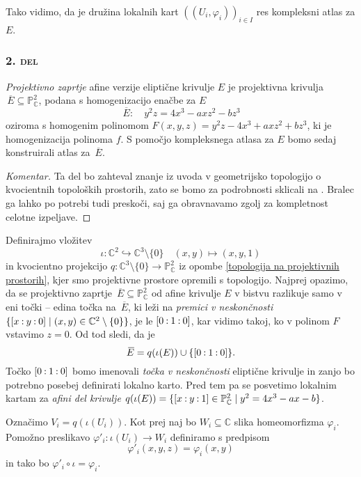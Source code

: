 \documentclass[mat1]{fmfdelo}
\numberwithin{equation}{section}
\newcommand{\C}{\mathbb C}
\newcommand{\PC}{\mathbb{P}^2_\C}
\newcommand{\oio}{\pcoor{0: 1 : 0}}
\newcommand{\pcoor}[1]{%
\begingroup\lccode`~=`: \lowercase{\endgroup
\edef~}{\mathbin{\mathchar\the\mathcode`:}\nobreak}%
\left[%
\begingroup
\mathcode`:=\string"8000
#1%
\endgroup
\right]%
}
\newcommand{\olsi}[1]{\,\overline{\!{#1}}} %
\theoremstyle{definition}
\newenvironment{komentar}[1][Komentar]{\begin{proof}[#1]\let\qed\relax}{\end{proof}}
\begin{document}
Tako vidimo, da je družina lokalnih kart $((U_i, \varphi_i))_{i \in I}$ res kompleksni atlas za $E$. 

\subsubsection*{\textsc{2. del}} 
\emph{Projektivno zaprtje} afine verzije eliptične krivulje $E$ je projektivna krivulja $\olsi{E} \subseteq \PC$, podana s homogenizacijo enačbe za $E$
\[
    \olsi{E} : \quad y^2z = 4x^3 - axz^2 - bz^3  
\]
oziroma s homogenim polinomom $F(x,y,z) = y^2z - 4x^3 + axz^2 + bz^3$, ki je homogenizacija polinoma $f$. S pomočjo kompleksnega atlasa za $E$ bomo sedaj konstruirali atlas za $\olsi{E}$. 

\begin{komentar}
    Ta del bo zahteval znanje iz uvoda v geometrijsko topologijo o kvocientnih topoloških prostorih, zato se bomo za podrobnosti sklicali na \cite[poglavje 3.2.]{MrcunTop}. Bralec ga lahko po potrebi tudi preskoči, saj ga obravnavamo zgolj za kompletnost celotne izpeljave. 
\end{komentar}

Definirajmo vložitev 
\[
    \iota: \C^2 \hookrightarrow \C^3\setminus\{0\} \quad (x,y) \mapsto (x,y,1)
\]
in kvocientno projekcijo $q : \C^3 \setminus \{0\} \to \PC$ iz opombe \ref{topologija na projektivnih prostorih}, kjer smo projektivne prostore opremili s topologijo. Najprej opazimo, da se projektivno zaprtje $\olsi{E} \subseteq \PC$ od afine krivulje $E$ v bistvu razlikuje samo v eni točki -- edina točka na $\olsi{E}$, ki leži na \emph{premici v neskončnosti} $\{\pcoor{x : y : 0} \mid (x,y) \in \C^2\setminus\{0\}\}$, je le $\oio$, kar vidimo takoj, ko v polinom $F$ vstavimo $z = 0$. Od tod sledi, da je 
\[
    \olsi{E} = q(\iota(E)) \cup \{\pcoor{0 : 1 : 0}\}.
\] 
Točko $\pcoor{0 : 1 : 0}$ bomo imenovali \emph{točka v neskončnosti} eliptične krivulje in zanjo bo potrebno posebej definirati lokalno karto. Pred tem pa se posvetimo lokalnim kartam za \emph{afini del krivulje} $q(\iota(E)) = \{ \pcoor{x : y : 1} \in \PC \mid y^2 = 4x^3 - ax - b\}$.

Označimo $V_i = q(\iota(U_i))$. Kot prej naj bo $W_i \subseteq \C$ slika homeomorfizma $\varphi_i$. Pomožno preslikavo $\varphi'_i : \iota(U_i) \to W_i$ definiramo s predpisom 
\[
    \varphi'_i(x,y,z) = \varphi_i(x,y)
\]
in tako bo $\varphi'_i \circ \iota = \varphi_i$.
\end{document}
